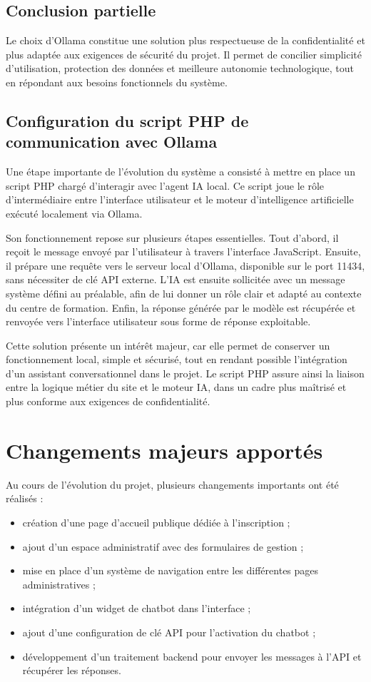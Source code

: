\documentclass[11pt,a4paper]{report}
\begin{document}
\section{Conclusion partielle}
Le choix d’Ollama constitue une solution plus respectueuse de la confidentialité et plus adaptée aux exigences de sécurité du projet. Il permet de concilier simplicité d’utilisation, protection des données et meilleure autonomie technologique, tout en répondant aux besoins fonctionnels du système.

\section{Configuration du script PHP de communication avec Ollama}
Une étape importante de l’évolution du système a consisté à mettre en place un script PHP chargé d’interagir avec l’agent IA local. Ce script joue le rôle d’intermédiaire entre l’interface utilisateur et le moteur d’intelligence artificielle exécuté localement via Ollama.

Son fonctionnement repose sur plusieurs étapes essentielles. Tout d’abord, il reçoit le message envoyé par l’utilisateur à travers l’interface JavaScript. Ensuite, il prépare une requête vers le serveur local d’Ollama, disponible sur le port 11434, sans nécessiter de clé API externe. L’IA est ensuite sollicitée avec un message système défini au préalable, afin de lui donner un rôle clair et adapté au contexte du centre de formation. Enfin, la réponse générée par le modèle est récupérée et renvoyée vers l’interface utilisateur sous forme de réponse exploitable.

Cette solution présente un intérêt majeur, car elle permet de conserver un fonctionnement local, simple et sécurisé, tout en rendant possible l’intégration d’un assistant conversationnel dans le projet. Le script PHP assure ainsi la liaison entre la logique métier du site et le moteur IA, dans un cadre plus maîtrisé et plus conforme aux exigences de confidentialité.

\chapter{Changements majeurs apportés}
Au cours de l’évolution du projet, plusieurs changements importants ont été réalisés :

\begin{itemize}[leftmargin=1.5em]
    \item création d’une page d’accueil publique dédiée à l’inscription ;
    \item ajout d’un espace administratif avec des formulaires de gestion ;
    \item mise en place d’un système de navigation entre les différentes pages administratives ;
    \item intégration d’un widget de chatbot dans l’interface ;
    \item ajout d’une configuration de clé API pour l’activation du chatbot ;
    \item développement d’un traitement backend pour envoyer les messages à l’API et récupérer les réponses.
\end{itemize}
\end{document}
